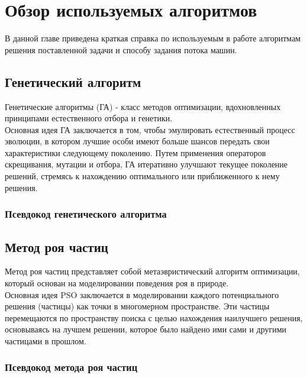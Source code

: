 \chapter{Обзор используемых алгоритмов} \label{ch2}
	

В данной главе приведена краткая справка по используемым в работе алгоритмам решения поставленной задачи  и способу задания потока машин.
\section{Генетический алгоритм} \label{ch2:title-abbr} %
Генетические алгоритмы (ГА) - класс методов оптимизации, вдохновленных принципами естественного отбора и генетики.\\
Основная идея ГА заключается в том, чтобы эмулировать естественный процесс эволюции, в котором лучшие особи имеют больше шансов передать свои характеристики следующему поколению.
Путем применения операторов скрещивания, мутации и отбора, ГА итеративно улучшают текущее поколение решений, стремясь к нахождению оптимального или приближенного к нему решения.
\newpage
\subsection{Псевдокод генетического алгоритма}
\section{Метод роя частиц}
Метод роя частиц представляет собой метаэвристический алгоритм оптимизации, который основан на моделировании поведения роя в природе.\\
Основная идея PSO заключается в моделировании каждого потенциального решения (частицы) как точки в многомерном пространстве. Эти частицы перемещаются по пространству поиска с целью нахождения наилучшего решения, основываясь на лучшем решении, которое было найдено ими сами и другими частицами в прошлом.
\subsection{Псевдокод метода роя частиц}

\newpage
